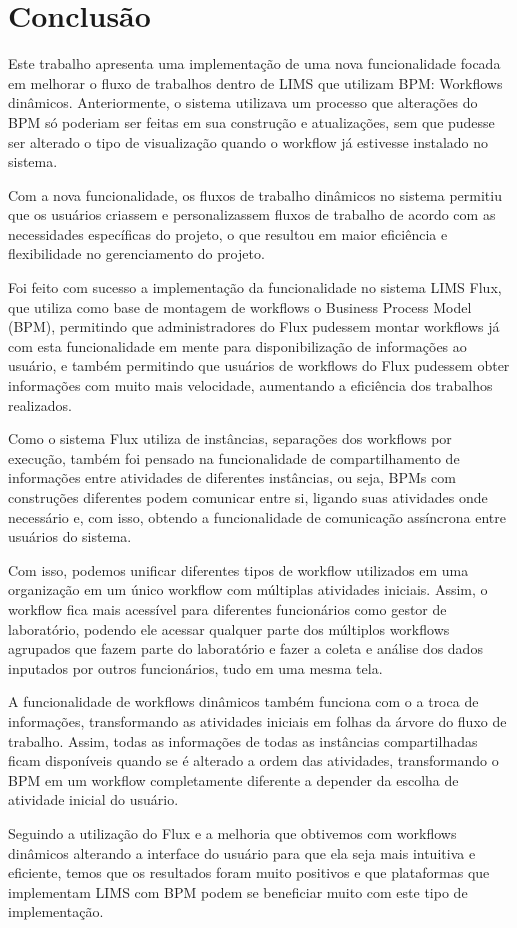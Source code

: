 \section{Conclusão}

Este trabalho apresenta uma implementação de uma nova funcionalidade focada em melhorar o fluxo de trabalhos dentro de LIMS que utilizam BPM: Workflows dinâmicos. Anteriormente, o sistema utilizava um processo que alterações do BPM só poderiam ser feitas em sua construção e atualizações, sem que pudesse ser alterado o tipo de visualização quando o workflow já estivesse instalado no sistema.

Com a nova funcionalidade, os fluxos de trabalho dinâmicos no sistema permitiu que os usuários criassem e personalizassem fluxos de trabalho de acordo com as necessidades específicas do projeto, o que resultou em maior eficiência e flexibilidade no gerenciamento do projeto.

Foi feito com sucesso a implementação da funcionalidade no sistema LIMS Flux, que utiliza como base de montagem de workflows o Business Process Model (BPM), permitindo que administradores do Flux pudessem montar workflows já com esta funcionalidade em mente para disponibilização de informações ao usuário, e também permitindo que usuários de workflows do Flux pudessem obter informações com muito mais velocidade, aumentando a eficiência dos trabalhos realizados.

Como o sistema Flux utiliza de instâncias, separações dos workflows por execução, também foi pensado na funcionalidade de compartilhamento de informações entre atividades de diferentes instâncias, ou seja, BPMs com construções diferentes podem comunicar entre si, ligando suas atividades onde necessário e, com isso, obtendo a funcionalidade de comunicação assíncrona entre usuários do sistema.

Com isso, podemos unificar diferentes tipos de workflow utilizados em uma organização em um único workflow com múltiplas atividades iniciais. Assim, o workflow fica mais acessível para diferentes funcionários como gestor de laboratório, podendo ele acessar qualquer parte dos múltiplos workflows agrupados que fazem parte do laboratório e fazer a coleta e análise dos dados inputados por outros funcionários, tudo em uma mesma tela.

A funcionalidade de workflows dinâmicos também funciona com o a troca de informações, transformando as atividades iniciais em folhas da árvore do fluxo de trabalho. Assim, todas as informações de todas as instâncias compartilhadas ficam disponíveis quando se é alterado a ordem das atividades, transformando o BPM em um workflow completamente diferente a depender da escolha de atividade inicial do usuário.

Seguindo a utilização do Flux e a melhoria que obtivemos com workflows dinâmicos alterando a interface do usuário para que ela seja mais intuitiva e eficiente, temos que os resultados foram muito positivos e que plataformas que implementam LIMS com BPM podem se beneficiar muito com este tipo de implementação.
